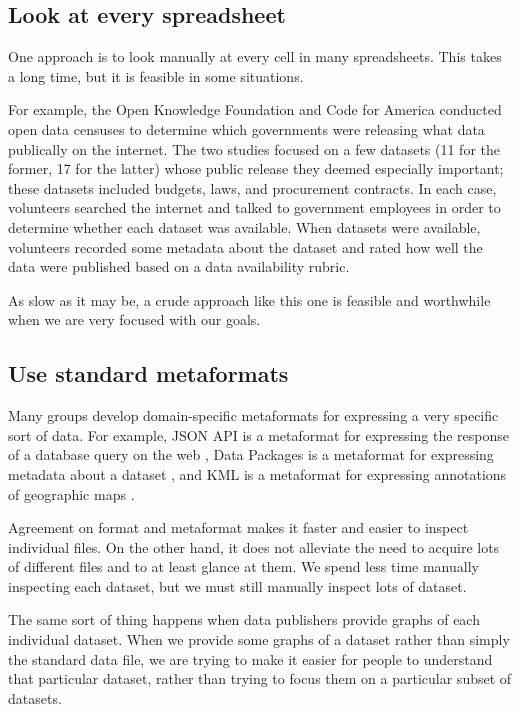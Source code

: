 \documentclass{acm_proc_article-sp}
\begin{document}
\subsection{Look at every spreadsheet}
One approach is to look manually at every cell in many spreadsheets.
This takes a long time, but it is feasible in some situations.

For example, the Open Knowledge Foundation \cite{open-data-census}
and Code for America \cite{open-data-census-us}
conducted open data censuses to determine which governments were
releasing what data publically on the internet. The two studies
focused on a few datasets (11 for the former, 17 for the latter)
whose public release they deemed especially important; these datasets
included budgets, laws, and procurement contracts.
In each case, volunteers searched the internet and talked to
government employees in order to determine whether each dataset was
available. When datasets were available, volunteers recorded some
metadata about the dataset and rated how well the data were published
based on a data availability rubric.

As slow as it may be, a crude approach like this one is feasible and
worthwhile when we are very focused with our goals.

\subsection{Use standard metaformats}
Many groups develop domain-specific metaformats for expressing a very specific
sort of data. For example, JSON API is a metaformat for expressing the
response of a database query on the web \cite{jsonapi}, Data Packages is a
metaformat for expressing metadata about a dataset \cite{datapackages},
and KML is a metaformat for expressing annotations of geographic maps \citep{kml}.

Agreement on format and metaformat makes it faster and easier to inspect
individual files. On the other hand, it does not alleviate the
need to acquire lots of different files and to at least glance at them.
We spend less time manually inspecting each dataset, but we must still
manually inspect lots of dataset.

The same sort of thing happens when data publishers provide graphs of
each individual dataset. When we provide some graphs of a dataset
rather than simply the standard data file, we are trying to make it easier for
people to understand that particular dataset, rather than trying to focus
them on a particular subset of datasets.
\end{document}
